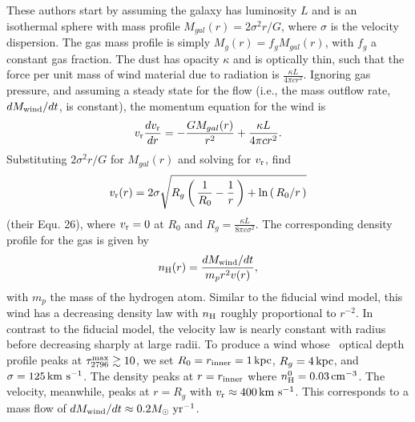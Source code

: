 \documentclass[12pt,preprint]{aastex}
\begin{document}
These authors start by assuming the galaxy has luminosity $L$ and is an isothermal sphere
with mass profile $M_{gal}(r) = 2\sigma^2r/G$, where $\sigma$ is the
velocity dispersion.  The gas mass profile is
simply $M_g(r) = f_g M_{gal}(r)$, with $f_g$ a constant gas fraction.  
The dust has opacity $\kappa$ and is optically thin, such that the force per unit mass of wind
material due to radiation is $\frac{\kappa L}{4\pi c r^2}$.
Ignoring gas pressure, and assuming a steady state for the flow (i.e.,
the mass outflow rate, $dM_{\rm wind}/dt$, is constant), the momentum
equation for the wind is 
\begin{equation}
v_{\rm r} \frac{dv_{\rm r}}{dr} = -\frac{GM_{gal}(r)}{r^2} + \frac{\kappa L}{4\pi c r^2}.
\end{equation}
Substituting $2\sigma^2 r/G$ for $M_{gal}(r)$ and solving for $v_{\rm r}$,
\citet{mqt05} find
\begin{equation}
v_{\rm r}(r) = 2\sigma \sqrt{R_g \left ( \, \frac{1}{R_0} - \frac{1}{r} \, \right )
   + \ln\left ( \, R_0/r \, \right ) }
\end{equation}
(their Equ. 26),
where $v_{\rm r} = 0$ at $R_0$ and $R_g = \frac{\kappa L}{8\pi c \sigma^2}$.
The corresponding density profile for the gas is given by
\begin{equation}
n_{\rm H}(r) = \frac{dM_{\rm wind}/dt}{m_p r^2 v(r)}, 
\end{equation}
with $m_p$ the mass of the hydrogen atom.
Similar to the fiducial wind model, this wind has a decreasing density
law with $n_{\rm H}$ roughly proportional to $r^{-2}$. 
In contrast to the fiducial model, the velocity law is nearly
constant with radius before decreasing sharply at large radii.
To produce a wind whose \mgiia\ optical depth profile peaks at 
$\tau_{2796}^{\rm max} \gtrsim 10$, we set $R_0 = r_{\rm inner} =
1\,\rm kpc$, $R_g=4\,\rm kpc$, and $\sigma = 125 \, {\rm km~s^{-1}}$.  The density
peaks at $r=r_{\rm inner}$ where $n_{\rm H}^0 = 0.03
\, {\rm cm^{-3}}$.  The velocity, meanwhile, peaks at $r=R_g$ with $v_{\rm r}
\approx 400 \, {\rm km~s^{-1}}$.  This corresponds to a mass flow of
$dM_{\rm wind}/dt \approx 0.2 M_\odot\; \rm yr^{-1}$.  
\end{document}
